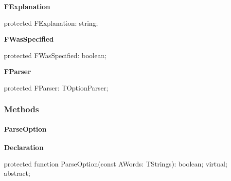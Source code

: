 \documentclass{report}
\newif\ifpdf
\begin{document}
\begin{list}{}
\begin{flushleft}
\ifpdf
\end{flushleft}
\fi


\par  \label{PasDoc_OptionParser.TOption-FExplanation}
\item[\textbf{FExplanation}\hfill]
\ifpdf
\begin{flushleft}
\fi
\begin{ttfamily}
protected FExplanation: string;\end{ttfamily}

\ifpdf
\end{flushleft}
\fi


\par  \label{PasDoc_OptionParser.TOption-FWasSpecified}
\item[\textbf{FWasSpecified}\hfill]
\ifpdf
\begin{flushleft}
\fi
\begin{ttfamily}
protected FWasSpecified: boolean;\end{ttfamily}

\ifpdf
\end{flushleft}
\fi


\par  \label{PasDoc_OptionParser.TOption-FParser}
\item[\textbf{FParser}\hfill]
\ifpdf
\begin{flushleft}
\fi
\begin{ttfamily}
protected FParser: TOptionParser;\end{ttfamily}

\ifpdf
\end{flushleft}
\fi


\par  \end{list}
\subsubsection*{\large{\textbf{Methods}}\normalsize\hspace{1ex}\hfill}
\paragraph*{ParseOption}\hspace*{\fill}

\label{PasDoc_OptionParser.TOption-ParseOption}
\begin{list}{}{
\setlength{\itemindent}{0cm}
\setlength{\listparindent}{0cm}
\setlength{\leftmargin}{\evensidemargin}
\addtolength{\leftmargin}{\tmplength}
\settowidth{\labelsep}{X}
\addtolength{\leftmargin}{\labelsep}
\setlength{\labelwidth}{\tmplength}
}
\item[\textbf{Declaration}\hfill]
\ifpdf
\begin{flushleft}
\fi
\begin{ttfamily}
protected function ParseOption(const AWords: TStrings): boolean; virtual; abstract;\end{ttfamily}

\ifpdf
\end{flushleft}
\fi

\end{list}
\end{document}
